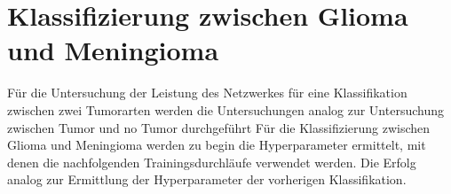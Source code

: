 \begin{table}[H]
    \centering
    \caption{Mittelwert und Standardabweichung der Metriken bei der Reduzierung der Tumor Klasse.}
    \label{tab:red_tu}
\end{table}

\section{Klassifizierung zwischen Glioma und Meningioma}
Für die Untersuchung der Leistung des Netzwerkes für eine Klassifikation zwischen zwei Tumorarten werden die Untersuchungen analog zur Untersuchung 
zwischen Tumor und no Tumor durchgeführt
Für die Klassifizierung zwischen Glioma und Meningioma werden zu begin die Hyperparameter ermittelt, mit denen die nachfolgenden
Trainingsdurchläufe verwendet werden. 
Die Erfolg analog zur Ermittlung der Hyperparameter der vorherigen Klassifikation.
